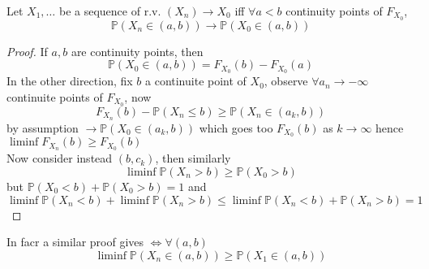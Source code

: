 \documentclass[../main.tex]{subfiles}
\begin{document}
\begin{lemma}
Let $X_1,\ldots$ be a sequence of r.v. $( X_n)\to X_0$ iff $\forall a<b$ continuity points of $F_{X_0} $,
\[ 
\mathbb{P}( X_n\in( a,b) ) \to \mathbb{P}( X_0\in ( a,b) ) 
\]

\end{lemma}
\begin{proof}
If $a,b$ are continuity points, then
\[ 
\mathbb{P}( X_0\in ( a,b) ) = F_{X_0} ( b) - F_{X_0} ( a) 
\]
In the other direction, fix $b$ a continuite point of $X_0$, observe $\forall a_n \to - \infty $ continuite points of $F_{X_0} $, now
\[ 
	F_{X_n} ( b) - \mathbb{P}( X_n \leq b) \geq \mathbb{P}( X_n \in ( a_k,b) ) 
\]
by assumption $\to \mathbb{P}( X_0\in ( a_k,b) ) $ which goes too $F_{X_0} ( b) $ as $k\to \infty $ 	
hence $ \liminf F_{X_n} ( b) \geq  F_{X_0} ( b) $\\
Now consider instead $( b,c_k) $, then similarly
\[ 
\liminf \mathbb{P}( X_n > b) \geq  \mathbb{P}( X_0 >b) 
\]
but $ \mathbb{P}( X_0 < b) + \mathbb{P}( X_0>b) =1$ and
\[ 
\liminf \mathbb{P}( X_n <b) + \liminf \mathbb{P}( X_n >b) \leq \liminf \mathbb{P}( X_n <b) + \mathbb{P}( X_n >b) =1
\]

\end{proof}
\begin{rmq}
In facr a similar proof gives $\iff \forall ( a,b) $ 
\[ 
\liminf \mathbb{P}( X_n \in ( a,b) ) \geq \mathbb{P}( X_1\in ( a,b) ) 
\]

\end{rmq}
\end{document}
